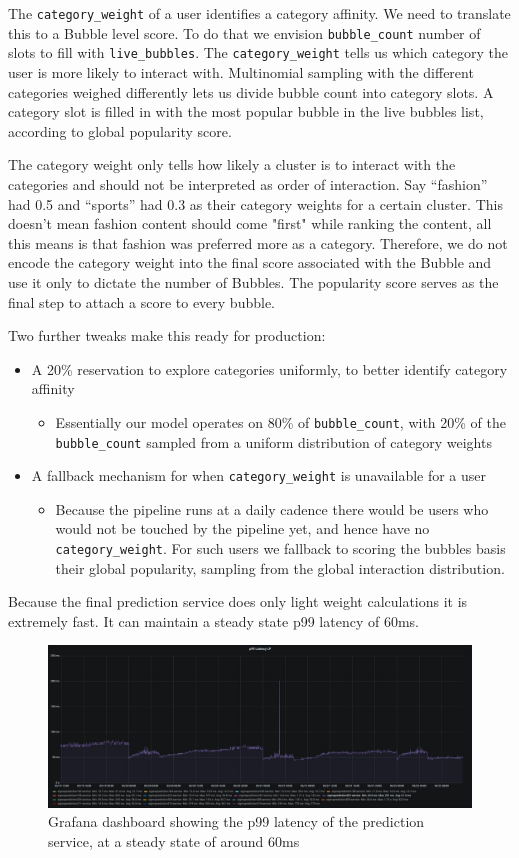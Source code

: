 The {\verb|category_weight|} of a user identifies a category affinity. We need to translate this to a Bubble level score. To do that we envision {\verb|bubble_count|} number of slots to fill with {\verb|live_bubbles|}. The {\verb|category_weight|} tells us which category the user is more likely to interact with. Multinomial sampling with the different categories weighed differently lets us divide bubble count into category slots. A category slot is filled in with the most popular bubble in the live bubbles list, according to global popularity score. 

The category weight only tells how likely a cluster is to interact with the categories and should not be interpreted as order of interaction. Say “fashion” had 0.5 and “sports” had 0.3 as their category weights for a certain cluster. This doesn't mean fashion content should come "first" while ranking the content, all this means is that fashion was preferred more as a category. Therefore, we do not encode the category weight into the final score associated with the Bubble and use it only to dictate the number of Bubbles. The popularity score serves as the final step to attach a score to every bubble. 

Two further tweaks make this ready for production: 
\begin{itemize}
    \item A 20\% reservation to explore categories uniformly, to better identify category affinity
    \begin{itemize}
        \item Essentially our model operates on 80\% of {\verb|bubble_count|}, with 20\% of the {\verb|bubble_count|} sampled from a uniform distribution of category weights 
    \end{itemize}
    \item A fallback mechanism for when {\verb|category_weight|} is unavailable for a user
    \begin{itemize}
        \item Because the pipeline runs at a daily cadence there would be users who would not be touched by the pipeline yet, and hence have no {\verb|category_weight|}. For such users we fallback to scoring the bubbles basis their global popularity, sampling from the global interaction distribution. 
    \end{itemize}
\end{itemize}

Because the final prediction service does only light weight calculations it is extremely fast. It can maintain a steady state p99 latency of 60ms. 

\begin{figure}[h]
  \centering
  \includegraphics[width=\linewidth]{figures/latency.jpeg}
  \caption[P99 Latency of the prediction service]{Grafana dashboard showing the p99 latency of the prediction service, at a steady state of around 60ms}
  \label{fig:latency}
\end{figure}

